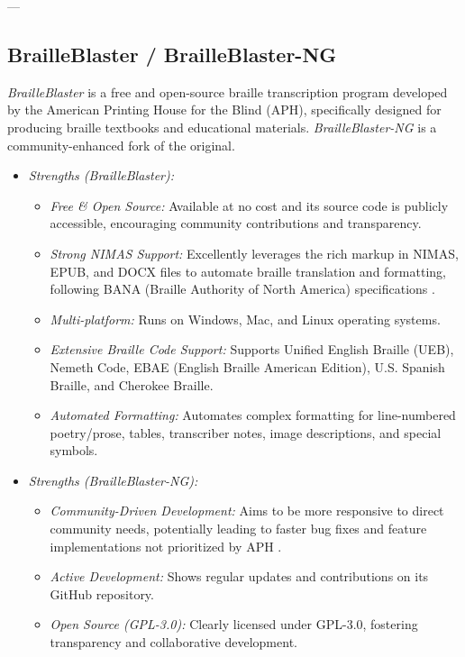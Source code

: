 ---

\subsection{BrailleBlaster / BrailleBlaster-NG}
\emph{BrailleBlaster} is a free and open-source braille transcription program developed by the American Printing House for the Blind (APH), specifically designed for producing braille textbooks and educational materials. \emph{BrailleBlaster-NG} is a community-enhanced fork of the original.

\begin{itemize}
    \item \emph{Strengths (BrailleBlaster):}
    \begin{itemize}
        \item \emph{Free \& Open Source:} Available at no cost and its source code is publicly accessible, encouraging community contributions and transparency.
        \item \emph{Strong NIMAS Support:} Excellently leverages the rich markup in NIMAS, EPUB, and DOCX files to automate braille translation and formatting, following BANA (Braille Authority of North America) specifications \cite{BrailleBlaster}.
        \item \emph{Multi-platform:} Runs on Windows, Mac, and Linux operating systems.
        \item \emph{Extensive Braille Code Support:} Supports Unified English Braille (UEB), Nemeth Code, EBAE (English Braille American Edition), U.S. Spanish Braille, and Cherokee Braille.
        \item \emph{Automated Formatting:} Automates complex formatting for line-numbered poetry/prose, tables, transcriber notes, image descriptions, and special symbols.
    \end{itemize}
    \item \emph{Strengths (BrailleBlaster-NG):}
    \begin{itemize}
        \item \emph{Community-Driven Development:} Aims to be more responsive to direct community needs, potentially leading to faster bug fixes and feature implementations not prioritized by APH \cite{BrailleBlasterNG}.
        \item \emph{Active Development:} Shows regular updates and contributions on its GitHub repository.
        \item \emph{Open Source (GPL-3.0):} Clearly licensed under GPL-3.0, fostering transparency and collaborative development.

\end{itemize}
\end{itemize}
